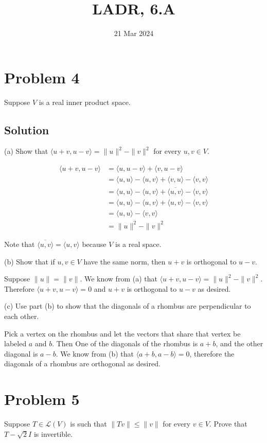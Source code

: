 \documentclass{article}
\title{LADR, 6.A}
\date{21 Mar 2024}
\begin{document}
\maketitle

\section*{Problem 4}
Suppose $V$ is a real inner product space.

\subsection*{Solution}
(a) Show that $\langle u+v,u-v\rangle=\|u\|^2-\|v\|^2$ for every $u,v\in V$.

\begin{align*}
    \langle u+v,u-v\rangle&=\langle u,u-v\rangle+\langle v, u-v\rangle\\
    &=\langle u,u\rangle-\langle u,v\rangle+\langle v,u\rangle-\langle v,v\rangle\\
    &=\langle u,u\rangle-\langle u,v\rangle+\overline{\langle u,v\rangle}-\langle v,v\rangle\\
    &=\langle u,u\rangle-\langle u,v\rangle+\langle u,v\rangle-\langle v,v\rangle\\
    &=\langle u,u\rangle-\langle v,v\rangle\\
    &=\|u\|^2-\|v\|^2
\end{align*}

Note that $\overline{\langle u,v\rangle}=\langle u,v\rangle$ because $V$ is a real space.

\vs

(b) Show that if $u,v\in V$ have the same norm, then $u+v$ is orthogonal to $u-v$.

Suppose $\|u\|=\|v\|$. We know from (a) that $\langle u+v,u-v\rangle=\|u\|^2-\|v\|^2$. Therefore $\langle u+v,u-v\rangle=0$ and $u+v$ is orthogonal to $u-v$ as desired.

\vs

(c) Use part (b) to show that the diagonals of a rhombus are perpendicular to each other.

Pick a vertex on the rhombus and let the vectors that share that vertex be labeled $a$ and $b$. Then One of the diagonals of the rhombus is $a+b$, and the other diagonal is $a-b$. We know from (b) that $\langle a+b,a-b\rangle=0$, therefore the diagonals of a rhombus are orthogonal as desired.

\section*{Problem 5}
Suppose $T\in\mathcal{L}(V)$ is such that $\|Tv\|\leq\|v\|$ for every $v\in V$. Prove that $T-\sqrt{2}I$ is invertible.
\end{document}

